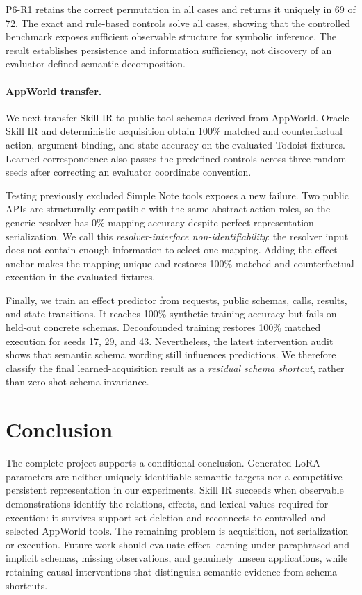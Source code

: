 \documentclass{article}
\begin{document}
P6-R1 retains the correct permutation in all cases and returns it uniquely in 69 of 72. The exact and rule-based controls solve all cases, showing that the controlled benchmark exposes sufficient observable structure for symbolic inference. The result establishes persistence and information sufficiency, not discovery of an evaluator-defined semantic decomposition.

\paragraph{AppWorld transfer.}
We next transfer Skill IR to public tool schemas derived from AppWorld. Oracle Skill IR and deterministic acquisition obtain 100\% matched and counterfactual action, argument-binding, and state accuracy on the evaluated Todoist fixtures. Learned correspondence also passes the predefined controls across three random seeds after correcting an evaluator coordinate convention.

Testing previously excluded Simple Note tools exposes a new failure. Two public APIs are structurally compatible with the same abstract action roles, so the generic resolver has 0\% mapping accuracy despite perfect representation serialization. We call this \emph{resolver-interface non-identifiability}: the resolver input does not contain enough information to select one mapping. Adding the effect anchor makes the mapping unique and restores 100\% matched and counterfactual execution in the evaluated fixtures.

Finally, we train an effect predictor from requests, public schemas, calls, results, and state transitions. It reaches 100\% synthetic training accuracy but fails on held-out concrete schemas. Deconfounded training restores 100\% matched execution for seeds 17, 29, and 43. Nevertheless, the latest intervention audit shows that semantic schema wording still influences predictions. We therefore classify the final learned-acquisition result as a \emph{residual schema shortcut}, rather than zero-shot schema invariance.

\section{Conclusion}

The complete project supports a conditional conclusion. Generated LoRA parameters are neither uniquely identifiable semantic targets nor a competitive persistent representation in our experiments. Skill IR succeeds when observable demonstrations identify the relations, effects, and lexical values required for execution: it survives support-set deletion and reconnects to controlled and selected AppWorld tools. The remaining problem is acquisition, not serialization or execution. Future work should evaluate effect learning under paraphrased and implicit schemas, missing observations, and genuinely unseen applications, while retaining causal interventions that distinguish semantic evidence from schema shortcuts.
\end{document}
